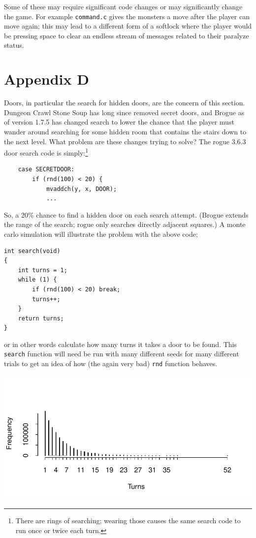 \documentclass[12pt,a4paper]{article}
\begin{document}
Some of these may require significant code changes or may significantly
change the game. For example \texttt{command.c} gives the monsters a
move after the player can move again; this may lead to a different form
of a softlock where the player would be pressing space to clear an
endless stream of messages related to their paralyze status.

\section*{Appendix D}

Doors, in particular the search for hidden doors, are the concern of
this section. Dungeon Crawl Stone Soup has long since removed secret
doors, and Brogue as of version 1.7.5 has changed search to lower the
chance that the player must wander around searching for some hidden room
that contains the stairs down to the next level. What problem are these
changes trying to solve? The rogue 3.6.3 door search code is
simply:\footnote{There are rings of searching; wearing those 
causes the same search code to run once or twice each turn.}

\begin{verbatim}
    case SECRETDOOR:
        if (rnd(100) < 20) {
            mvaddch(y, x, DOOR);
            ...
\end{verbatim}

So, a 20\% chance to find a hidden door on each search attempt.
(Brogue extends the range of the search; rogue only searches directly
adjacent squares.) A monte carlo simulation will illustrate the
problem with the above code;

\begin{verbatim}
int search(void)
{
    int turns = 1;
    while (1) {
        if (rnd(100) < 20) break;
        turns++;
    }
    return turns;
}
\end{verbatim}

or in other words calculate how many turns it takes a door to be found.
This \texttt{search} function will need be run with many different seeds
for many different trials to get an idea of how (the again very bad)
\texttt{rnd} function behaves.

\includegraphics{door-find-frequency.pdf}%
\end{document}
